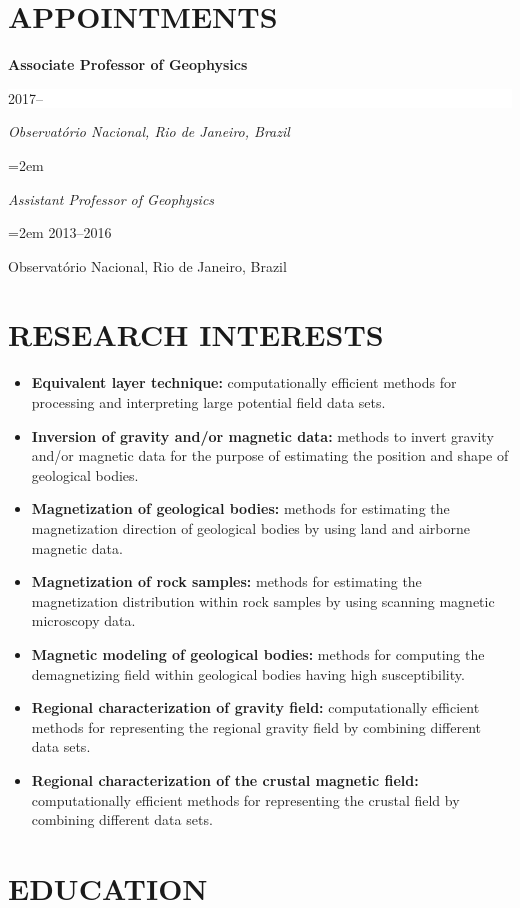 \documentclass[paper=letter,fontsize=11pt]{scrartcl} %
\newcommand{\sepspace}{\vspace*{1em}}		%
\newcommand{\NewPart}[2]{\section*{\uppercase{#1} #2}}
\newcommand{\EducationEntry}[4]{
		\noindent \textbf{#1} \hfill      %
		\colorbox{White}{%
			\parbox{10em}{%
			\hfill\color{Black}#2}} \par  %
		\noindent \textit{#3} \par        %
		\noindent\hangindent=2em\hangafter=0 \small #4 %
		\normalsize \par}
\begin{document}
\NewPart{Appointments}{}

\EducationEntry{Associate Professor of Geophysics}{2017--}
{Observat\'{o}rio Nacional, Rio de Janeiro, Brazil}

\EducationEntry{Assistant Professor of Geophysics}{2013--2016}
{Observat\'{o}rio Nacional, Rio de Janeiro, Brazil}

\sepspace

\NewPart{Research interests}{}

{\begin{itemize}

\item{\textbf{Equivalent layer technique:} computationally efficient methods for processing and interpreting large potential field data sets.}

\item{\textbf{Inversion of gravity and/or magnetic data:} methods to invert gravity and/or magnetic data for the purpose of estimating the position and shape of geological bodies.}

\item{\textbf{Magnetization of geological bodies:} methods for estimating the magnetization direction of geological bodies by using land and airborne magnetic data.}

\item{\textbf{Magnetization of rock samples:} methods for estimating the magnetization distribution within rock samples by using scanning magnetic microscopy data.}

\item{\textbf{Magnetic modeling of geological bodies:} methods for computing the demagnetizing field within geological bodies having high susceptibility.}

\item{\textbf{Regional characterization of gravity field:} computationally efficient methods for representing the regional gravity field by combining different data sets.}

\item{\textbf{Regional characterization of the crustal magnetic field:} computationally efficient methods for representing the crustal field by combining different data sets.}

\end{itemize}}

\sepspace

\NewPart{Education}{}
\end{document}
